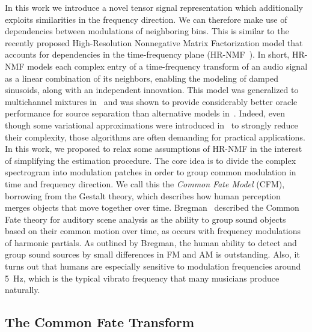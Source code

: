 {{In this work we introduce a novel tensor signal representation which additionally exploits similarities in the frequency direction.
We can therefore make use of dependencies between modulations of neighboring bins.
This is similar to the recently proposed High-Resolution Nonnegative Matrix Factorization model that accounts for dependencies in the time-frequency plane (HR-NMF~\cite{badeau11}).
In short, HR-NMF models each complex entry of a time-frequency transform of an audio signal as a linear combination of its neighbors, enabling the modeling of damped sinusoids, along with an independent innovation.
This model was generalized to multichannel mixtures in~\cite{badeau13a,badeau14} and was shown to provide considerably better oracle performance for source separation than alternative models in~\cite{magron15a}.
Indeed, even though some variational approximations were introduced in~\cite{badeau13} to strongly reduce their complexity, those algorithms are often demanding for practical applications.
In this work, we proposed to relax some assumptions of HR-NMF in the interest of simplifying the estimation procedure.
The core idea is to divide the complex spectrogram into modulation patches in order to group common modulation in time and frequency direction.
We call this the \emph{Common Fate Model} (CFM), borrowing from the Gestalt theory, which describes how human perception merges objects that move together over time.
Bregman~\cite{bregman94} described the Common Fate theory for auditory scene analysis as the ability to group sound objects based on their common motion over time, as occurs with frequency modulations of harmonic partials.
As outlined by Bregman, the human ability to detect and group sound sources by small differences in FM and AM is outstanding.
Also, it turns out that humans are especially sensitive to modulation frequencies around 5~Hz, which is the typical vibrato frequency that many musicians produce naturally.

\subsection{The Common Fate Transform}
\label{sub:CFT}

}}
